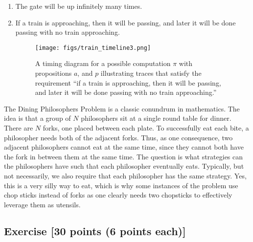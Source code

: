 \documentclass{elsarticle} %
\begin{document}
\begin{enumerate}
\item   The gate will be up infinitely many times.
\item   If a train is approaching, then it will be passing, and later it will be done passing with no train approaching.
\begin{figure}[H]
  \begin{center}
     \texttt{[image: figs/train\_timeline3.png]}
  \end{center}
\caption{A timing diagram for a possible computation $\pi$ with propositions $a$, and $p$ illustrating traces that satisfy the requirement ``if a train is approaching, then it will be passing, and later it will be done passing with no train approaching.''}
\end{figure}

\end{enumerate}


The Dining Philosophers Problem is a classic conundrum in mathematics. The idea is that a group of $N$ philosophers sit at a single round table for dinner. There are $N$ forks, one placed between each plate. To successfully eat each bite, a philosopher needs both of the adjacent forks. Thus, as one consequence, two adjacent philosophers cannot eat at the same time, since they cannot both have the fork in between them at the same time. The question is what strategies can the philosophers have such that each philosopher eventually eats. Typically, but not necessarily, we also require that each philosopher has the same strategy. Yes, this is a very silly way to eat, which is why some instances of the problem use chop sticks instead of forks as one clearly needs two chopsticks to effectively leverage them as utensils. 


\subsection{Exercise [30 points (6 points each)]}
\end{document}
